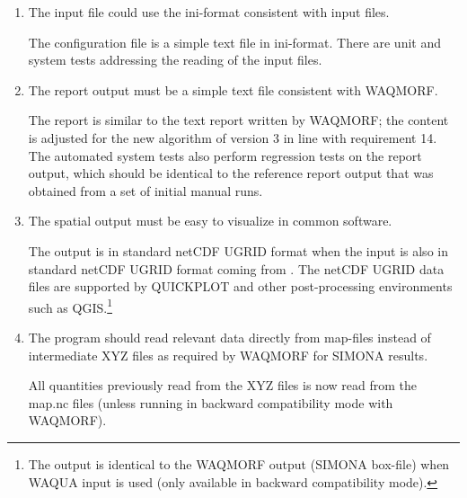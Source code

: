 \begin{enumerate}
\item \begin{requirement}
The input file could use the ini-format consistent with \dflowfm input files.
\end{requirement}
\begin{testmethod}
The \dfastmi configuration file is a simple text file in ini-format.
There are unit and system tests addressing the reading of the input files.
\end{testmethod}

\item \begin{requirement}
The report output must be a simple text file consistent with WAQMORF.
\end{requirement}
\begin{testmethod}
The report is similar to the text report written by WAQMORF; the content is adjusted for the new algorithm of \dfastmi version 3 in line with requirement 14.
The automated system tests also perform regression tests on the report output, which should be identical to the reference report output that was obtained from a set of initial manual runs.
\end{testmethod}

\item \begin{requirement}
The spatial output must be easy to visualize in common software.
\end{requirement}
\begin{testmethod}
The output is in standard netCDF UGRID format when the input is also in standard netCDF UGRID format coming from \dflowfm.
The netCDF UGRID data files are supported by QUICKPLOT and other post-processing environments such as QGIS.\footnote{The output is identical to the WAQMORF output (SIMONA box-file) when WAQUA input is used (only available in backward compatibility mode).}
\end{testmethod}

\item \begin{requirement}
The program should read relevant data directly from \dflowfm map-files instead of intermediate XYZ files as required by WAQMORF for SIMONA results.
\end{requirement}
\begin{testmethod}
All quantities previously read from the XYZ files is now read from the \dflowfm map.nc files (unless running in backward compatibility mode with WAQMORF).
\end{testmethod}


\end{enumerate}
